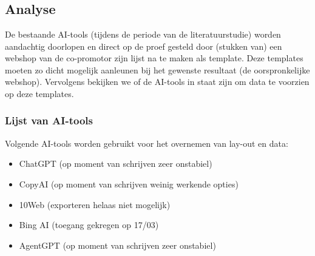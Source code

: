
\chapter{}%
\label{ch:methodologie}


\section{Analyse}
De bestaande AI-tools (tijdens de periode van de literatuurstudie) worden aandachtig doorlopen en direct op de proef gesteld door (stukken van) een webshop van de co-promotor zijn lijst na te maken als template. Deze templates moeten zo dicht mogelijk aanleunen bij het gewenste resultaat (de oorspronkelijke webshop). Vervolgens bekijken we of de AI-tools in staat zijn om data te voorzien op deze templates.

\subsection{Lijst van AI-tools}
Volgende AI-tools worden gebruikt voor het overnemen van lay-out en data:
\begin{itemize}
    \item ChatGPT (op moment van schrijven zeer onstabiel)
    \item CopyAI (op moment van schrijven weinig werkende opties)
    \item 10Web (exporteren helaas niet mogelijk)
    \item Bing AI (toegang gekregen op 17/03)
    \item AgentGPT (op moment van schrijven zeer onstabiel)
\end{itemize} 


